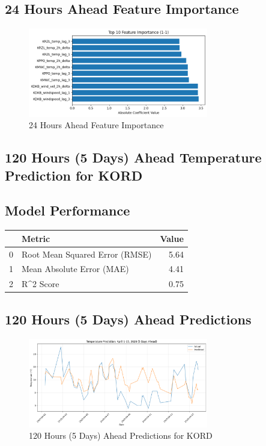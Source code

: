 \subsection{24 Hours Ahead Feature Importance}
\begin{figure}[htbp]
\centering
\includegraphics[width=0.7\textwidth]{1-1-linear_temp_shift_feature_importance.png}
\caption{24 Hours Ahead Feature Importance}
\label{fig:24_hours_ahead_featimp}
\end{figure}



\subsection{120 Hours (5 Days) Ahead Temperature Prediction for KORD}
\subsection{Model Performance}
\begin{tabular}{llr}
\toprule
 & Metric & Value \\
\midrule
0 & Root Mean Squared Error (RMSE) & 5.64 \\
1 & Mean Absolute Error (MAE) & 4.41 \\
2 & R^2 Score & 0.75 \\
\bottomrule
\end{tabular}

\subsection{120 Hours (5 Days) Ahead Predictions}
\begin{figure}[htbp]
\centering
\includegraphics[width=0.7\textwidth]{1-2-linear_temp_shift_results.png}
\caption{120 Hours (5 Days) Ahead Predictions for KORD}
\label{fig:120_hours_(5_days)_ahead_pred}
\end{figure}

